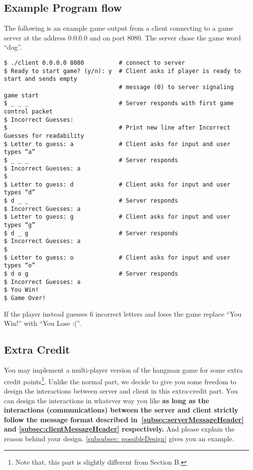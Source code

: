 \documentclass[12pt]{article}
\begin{document}
\subsection{Example Program flow}\label{subsec:exampleProgramFlow}

The following is an example game output from a client connecting to a game server at the
address 0.0.0.0 and on port 8080. The server chose the game word ``dog''.

\begin{verbatim}
$ ./client 0.0.0.0 8080          # connect to server
$ Ready to start game? (y/n): y  # Client asks if player is ready to start and sends empty
                                 # message (0) to server signaling game start
$ _ _ _                          # Server responds with first game control packet
$ Incorrect Guesses:
$                                # Print new line after Incorrect Guesses for readability
$ Letter to guess: a             # Client asks for input and user types “a”
$ _ _ _                          # Server responds
$ Incorrect Guesses: a
$
$ Letter to guess: d             # Client asks for input and user types “d”
$ d _ _                          # Server responds
$ Incorrect Guesses: a
$ Letter to guess: g             # Client asks for input and user types “g”
$ d _ g                          # Server responds
$ Incorrect Guesses: a
$
$ Letter to guess: o             # Client asks for input and user types “o”
$ d o g                          # Server responds
$ Incorrect Guesses: a
$ You Win!
$ Game Over!
\end{verbatim}
\medskip
If the player instead guesses 6 incorrect letters and loses the game replace “You Win!” with 
``You Lose :(''.

\subsection{Extra Credit}\label{subsec:extraCredit}

You may implement a multi-player version of the hangman game for some extra credit 
points\footnote{Note that, this part is slightly different from Section B.}. 
Unlike the normal part, we decide to give you some freedom to design the interactions 
between server and client in this extra-credit part. You can design the interactions in whatever 
way you like {\bf as long as the interactions (communications) between the server and 
client strictly follow the message format described in~\autoref{subsec:serverMessageHeader} 
and \autoref{subsec:clientMessageHeader} respectively.} And please explain the reason behind your design. \autoref{subsubsec: possibleDesign} gives you an example.
\end{document}

